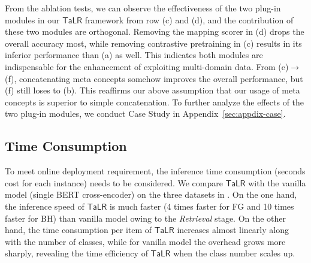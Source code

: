 From the ablation tests, we can observe the effectiveness of the two plug-in modules in our $\mathsf{TaLR}$ framework from row (c) and (d), and the contribution of these two modules are orthogonal. 
Removing the mapping scorer in (d) drops the overall accuracy most, 
while removing contrastive pretraining in (c) results in its inferior performance than (a) as well. 
This indicates both modules are indispensable for the enhancement of exploiting multi-domain data.
From (e)$\rightarrow$(f), concatenating meta concepts somehow improves the overall performance, but (f) still loses to (b). This reaffirms our above assumption that our usage of meta concepts is superior to simple concatenation. 
To further analyze the effects of the two plug-in modules, we conduct Case Study in Appendix~\ref{sec:appdix-case}.

\subsection{Time Consumption} 
\label{sec:time cons}
To meet online deployment requirement, the inference time consumption (seconds cost for each instance) needs to be considered. We compare $\mathsf{TaLR}$ with the vanilla model (single BERT cross-encoder) on the three datasets in .
On the one hand, the inference speed of $\mathsf{TaLR}$ is much faster (4 times faster for FG and 10 times faster for BH) than vanilla model owing to the \textit{Retrieval} stage. On the other hand, the time consumption per item of $\mathsf{TaLR}$ increases almost linearly along with the number of classes, while for vanilla model the overhead grows more sharply, revealing the time efficiency of $\mathsf{TaLR}$ when the class number scales up. 

